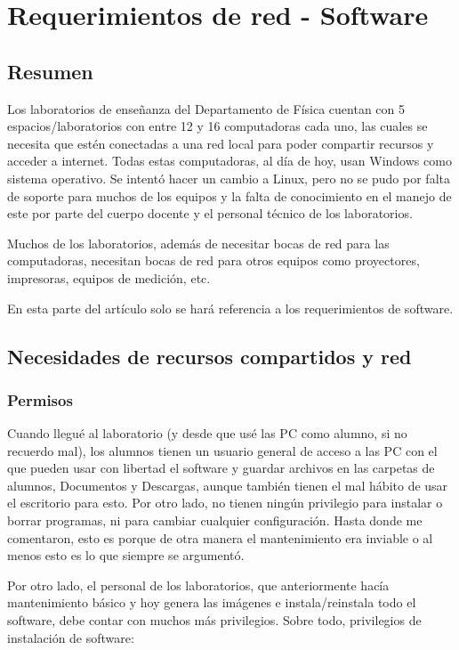 \chapter[Requerimientos de red - Software]{Requerimientos de red - Software}
\label{cp:requerimientos-software}

\section*{Resumen}
Los laboratorios de enseñanza del Departamento de Física cuentan con 5 espacios/laboratorios con entre 12 y 16 computadoras cada uno, las cuales se necesita que estén conectadas a una red local para poder compartir recursos y acceder a internet. Todas estas computadoras, al día de hoy, usan Windows como sistema operativo. Se intentó hacer un cambio a Linux, pero no se pudo por falta de soporte para muchos de los equipos y la falta de conocimiento en el manejo de este por parte del cuerpo docente y el personal técnico de los laboratorios.

Muchos de los laboratorios, además de necesitar bocas de red para las computadoras, necesitan bocas de red para otros equipos como proyectores, impresoras, equipos de medición, etc.

En esta parte del artículo solo se hará referencia a los requerimientos de software. 

\section{Necesidades de recursos compartidos y red}
\subsection{Permisos}
Cuando llegué al laboratorio (y desde que usé las PC como alumno, si no recuerdo mal), los alumnos tienen un usuario general de acceso a las PC con el que pueden usar con libertad el software y guardar archivos en las carpetas de alumnos, Documentos y Descargas, aunque también tienen el mal hábito de usar el escritorio para esto. Por otro lado, no tienen ningún privilegio para instalar o borrar programas, ni para cambiar cualquier configuración. 
Hasta donde me comentaron, esto es porque de otra manera el mantenimiento era inviable o al menos esto es lo que siempre se argumentó.

Por otro lado, el personal de los laboratorios, que anteriormente hacía mantenimiento básico y hoy genera las imágenes e instala/reinstala todo el software, debe contar con muchos más privilegios. Sobre todo, privilegios de instalación de software:

